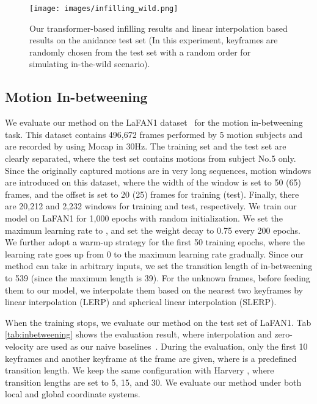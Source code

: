 \documentclass[10pt,twocolumn,letterpaper]{article}
\begin{document}
\begin{figure*}[ht]
  \centering
  \texttt{[image: images/infilling\_wild.png]}
  \caption{Our transformer-based infilling results and linear interpolation based results on the anidance test set (In this experiment, keyframes are randomly chosen from the test set with a random order for simulating in-the-wild scenario).}
  \label{fig:infilling_wild}
\end{figure*}

\subsection{Motion In-betweening} \label{Sec:in-betweening}

We evaluate our method on the LaFAN1 dataset~\cite{harvey2020robust} for the motion in-betweening task. This dataset contains 496,672 frames performed by 5 motion subjects and are recorded by using Mocap in 30Hz. The training set and the test set are clearly separated, where the test set contains motions from subject No.5 only. Since the originally captured motions are in very long sequences, motion windows are introduced on this dataset, where the width of the window is set to 50 (65) frames, and the offset is set to 20 (25) frames for training (test). Finally, there are 20,212 and 2,232 windows for training and test, respectively. We train our model on LaFAN1 for 1,000 epochs with random initialization. We set the maximum learning rate to , and set the weight decay to 0.75 every 200 epochs. We further adopt a warm-up strategy for the first 50 training epochs, where the learning rate goes up from 0 to the maximum learning rate gradually. Since our method can take in arbitrary inputs, we set the transition length of in-betweening to 539 (since the maximum length is 39). For the unknown frames, before feeding them to our model, we interpolate them based on the nearest two keyframes by linear interpolation (LERP) and spherical linear interpolation (SLERP).

When the training stops, we evaluate our method on the test set of LaFAN1. Tab \ref{tab:inbetweening} shows the evaluation result, where interpolation and zero-velocity are used as our naive baselines~\cite{harvey2020robust}. During the evaluation, only the first 10 keyframes and another keyframe at the frame  are given, where  is a predefined transition length. We keep the same configuration with Harvery \etal, where transition lengths are set to 5, 15, and 30. We evaluate our method under both local and global coordinate systems.
\end{document}
